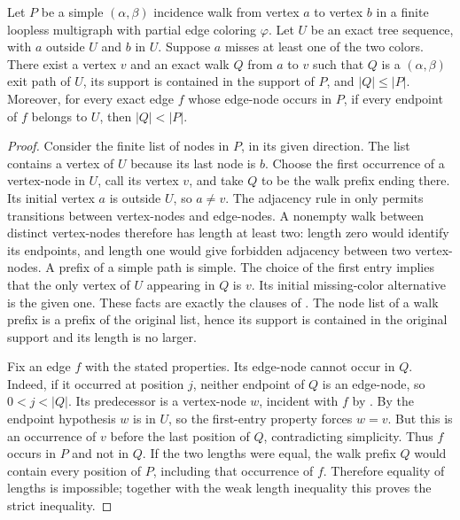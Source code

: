 \begin{lemma}
Let $P$ be a simple $(\alpha,\beta)$ incidence walk from vertex $a$ to
vertex $b$ in a finite loopless multigraph with partial edge coloring $\varphi$.
Let $U$ be an exact tree sequence, with $a$ outside $U$ and $b$ in $U$.
Suppose $a$ misses at least one of the two colors.  There exist a vertex
$v$ and an exact walk $Q$ from $a$ to $v$ such that $Q$ is a
$(\alpha,\beta)$ exit path of $U$, its support is contained in the
support of $P$, and $|Q|\leq |P|$.  Moreover, for every exact edge $f$
whose edge-node occurs in $P$, if every endpoint of $f$ belongs to $U$,
then $|Q|<|P|$.
\end{lemma}
\begin{proof}
Consider the finite list of nodes in $P$, in its given direction.
The list contains a vertex of $U$ because its last node is $b$.
Choose the first occurrence of a vertex-node in $U$, call its vertex
$v$, and take $Q$ to be the walk prefix ending there.  Its initial
vertex $a$ is outside $U$, so $a\ne v$.  The adjacency rule in
 only permits transitions between
vertex-nodes and edge-nodes.  A nonempty walk between distinct
vertex-nodes therefore has length at least two: length zero would
identify its endpoints, and length one would give forbidden adjacency
between two vertex-nodes.  A prefix of a simple path is simple.  The
choice of the first entry implies that the only vertex of $U$ appearing
in $Q$ is $v$.  Its initial missing-color alternative is the given one.
These facts are exactly the clauses of .
The node list of a walk prefix is a prefix of the original list, hence
its support is contained in the original support and its length is no
larger.

Fix an edge $f$ with the stated properties.  Its edge-node cannot occur
in $Q$.  Indeed, if it occurred at position $j$, neither endpoint of
$Q$ is an edge-node, so $0<j<|Q|$.  Its predecessor is a vertex-node
$w$, incident with $f$ by .  By the
endpoint hypothesis $w$ is in $U$, so the first-entry property forces
$w=v$.  But this is an occurrence of $v$ before the last position of
$Q$, contradicting simplicity.  Thus $f$ occurs in $P$ and not in
$Q$.  If the two lengths were equal, the walk prefix $Q$ would contain
every position of $P$, including that occurrence of $f$.  Therefore
equality of lengths is impossible; together with the weak length
inequality this proves the strict inequality.
\end{proof}
